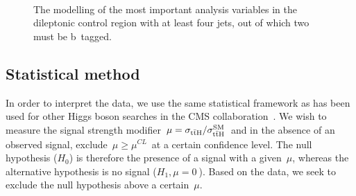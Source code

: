 \begin{figure}
\begin{centering}
 \\

\caption[The modelling of the kinematic distributions in the dileptonic control region]{The modelling of the most important analysis variables in the dileptonic control region with at least four jets, out of which two must be b~tagged.}
\label{fig:tth_dl_control}
\end{centering}
\end{figure}


\subsection{Statistical method}
\label{sec:statistical_method}
In order to interpret the data, we use the same statistical framework as has been used for other Higgs boson searches in the CMS collaboration~\cite{Chatrchyan:2012xdj,Chatrchyan:2012tx,ATLAS:2011tau}. We wish to measure the signal strength modifier~$\mu = \sigma_{\mathrm{t} \bar{\mathrm{t}} \mathrm{H}}/\sigma_{\mathrm{t} \bar{\mathrm{t}} \mathrm{H}}^{\mathrm{SM}}$~and in the absence of an observed signal, exclude~$\mu \ge \mu^{CL}$~at a certain confidence level. The null hypothesis ($H_0$) is therefore the presence of a signal with a given~$\mu$, whereas the alternative hypothesis is no signal ($H_1, \mu = 0~$). Based on the data, we seek to exclude the null hypothesis above a certain~$\mu$.

